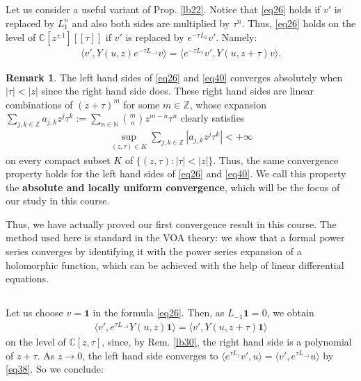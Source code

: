 \documentclass[11pt,b5paper,notitlepage]{article}
\theoremstyle{definition}
\newtheorem{rem}[df]{Remark}
\theoremstyle{plain}
\newcommand{\id}{\mathbf{1}}
\newcommand{\bigbk}[1]{\big\langle {#1}\big\rangle}
\newcommand{\Cbb}{\mathbb C}
\newcommand{\Nbb}{\mathbb N}
\newcommand{\Zbb}{\mathbb Z}
\numberwithin{equation}{section}
\begin{document}
\subsection{}


Let us consider a useful  variant of Prop. \ref{lb22}. Notice that  \eqref{eq26} holds if $v'$ is replaced by $L_1^n$ and also both sides are multiplied by $\tau^n$. Thus, \eqref{eq26} holds on the level of $\Cbb[z^{\pm1}][[\tau]]$ if $v'$ is replaced by $e^{-\tau L_1}v'$. Namely:
\begin{align}
	\bigbk{v',Y(u,z)e^{-\tau L_{-1}}v}=\bigbk{e^{-\tau L_1}v',Y(u,z+\tau)v}.\label{eq40}
\end{align}

\begin{rem}
The left hand sides of \eqref{eq26} and \eqref{eq40} converges absolutely when $|\tau|<|z|$ since the right hand side does. These right hand sides are  linear combinations of $(z+\tau)^m$ for some $m\in\Zbb$, whose expansion $\sum_{j,k\in\Zbb}a_{j,k}z^j\tau^k:=\sum_{n\in\Nbb}{m\choose n}z^{m-n}\tau^n$ clearly satisfies
\begin{align}
\sup_{(z,\tau)\in K}	\sum_{j,k\in\Zbb}|a_{j,k}z^j\tau^k|<+\infty
\end{align}
on every compact subset $K$ of $\{(z,\tau):|\tau|<|z|\}$. Thus, the same convergence property holds for the left hand sides of \eqref{eq26} and \eqref{eq40}. We call this property the \textbf{absolute and locally uniform convergence}, which will be the focus of our study in this course.
\end{rem}


Thus, we have actually proved our first convergence result in this course. The method used here is standard in the VOA theory: we show that a formal power series converges by identifying it with the power series expansion of a holomorphic function, which can be achieved with the help of linear differential equations.





\subsection{}

Let us choose $v=\id$ in the formula \eqref{eq26}. Then, as $L_{-1}\id=0$, we obtain
\begin{align}
	\bigbk{v',e^{\tau L_{-1}}Y(u,z)\id}=\bigbk{v',Y(u,z+\tau)\id}\label{eq39}
\end{align}
on the level of $\Cbb[z,\tau]$, since, by Rem. \ref{lb30},  the right hand side is a polynomial of $z+\tau$.  As $z\rightarrow 0$, the left hand side converges to $\bigbk{e^{\tau L_1}v',u}=\bigbk{v',e^{\tau L_{-1}}u}$ by \eqref{eq38}. So we conclude:
\end{document}
